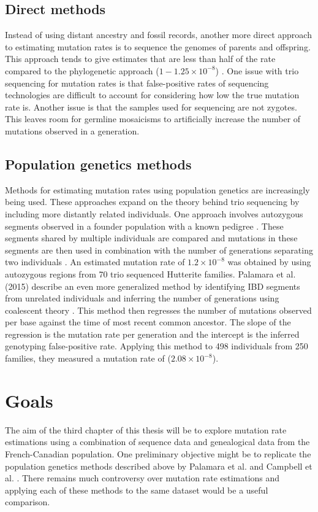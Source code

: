 \documentclass[
11pt, %
oneside, %
english, %
doublespacing, %
headsepline, %
chapterinoneline, %
]{MastersDoctoralThesis} %
\begin{document}
\subsection{Direct methods}
Instead of using distant ancestry and fossil records, another more direct approach to estimating mutation rates is to sequence the genomes of parents and offspring. 
This approach tends to give estimates that are less than half of the rate compared to the phylogenetic approach ($1-1.25\times10^{-8}$) \citep{Shendure2015,Narasimhan2016}.
One issue with trio sequencing for mutation rates is that false-positive rates of sequencing technologies are difficult to account for considering how low the true mutation rate is.
Another issue is that the samples used for sequencing are not zygotes.
This leaves room for germline mosaicisms to artificially increase the number of mutations observed in a generation.

\subsection{Population genetics methods}
Methods for estimating mutation rates using population genetics are increasingly being used.
These approaches expand on the theory behind trio sequencing by including more distantly related individuals.
One approach involves autozygous segments observed in a founder population with a known pedigree \citep{Campbell2012}.
These segments shared by multiple individuals are compared and mutations in these segments are then used in combination with the number of generations separating two individuals \citep{Campbell2012}.
An estimated mutation rate of $1.2\times10^{-8}$ was obtained by using autozygous regions from 70 trio sequenced Hutterite families.
Palamara et al. (2015) describe an even more generalized method by identifying IBD segments from unrelated individuals and inferring the number of generations using coalescent theory \citep{Palamara2012,Palamara2015,Baharian2016}.
This method then regresses the number of mutations observed per base against the time of most recent common ancestor.
The slope of the regression is the mutation rate per generation and the intercept is the inferred genotyping false-positive rate.
Applying this method to 498 individuals from 250 families, they measured a mutation rate of ($2.08\times10^{-8}$)\citep{Palamara2015}.

\section{Goals}
The aim of the third chapter of this thesis will be to explore mutation rate estimations using a combination of sequence data and genealogical data from the French-Canadian population.
One preliminary objective might be to replicate the population genetics methods described above by Palamara et al. and Campbell et al. \citep{Palamara2015,Campbell2012}.
There remains much controversy over mutation rate estimations and applying each of these methods to the same dataset would be a useful comparison.
\end{document}
